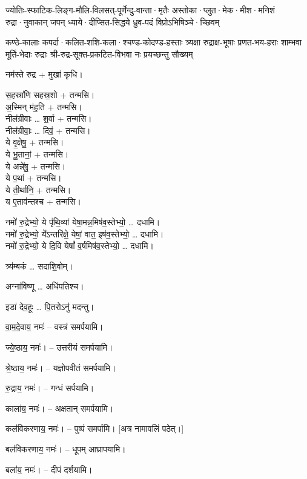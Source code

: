 \setlength{\shlokaspaceskip}{2pt}
{ज्योतिः-स्फाटिक-लिङ्ग-मौलि-विलसत्-पूर्णेन्दु-वान्ता·मृतैः}
{अस्तोका·प्लुत·मेक·मीश·मनिशं रुद्रा·नुवाकान् जपन्}
{ध्याये·दीप्सित-सिद्धये ध्रुव-पदं विप्रोऽभिषिञ्चे·च्छिवम्}

{कण्ठे-कालाः कपर्दा·कलित-शशि-कला·श्चण्ड-कोदण्ड-हस्ताः}
{त्र्यक्षा रुद्राक्ष-भूषाः प्रणत-भय-हराः शाम्भवा मूर्ति-भेदाः}
{रुद्राः श्री-रुद्र-सूक्त-प्रकटित-विभवा नः प्रयच्छन्तु सौख्यम्}

नम॑स्ते रुद्र + मुखा॑ कृधि।

स॒हस्रा॑णि सहस्र॒शो + तन्मसि।\\
अ॒स्मिन् म॑ह॒ति + तन्मसि।\\
नील॑ग्रीवाः … श॒र्वा + तन्मसि।\\
नील॑ग्रीवाः॒ … दिवं॒ + तन्मसि।\\
ये वृ॒क्षेषु॒ + तन्मसि।\\
ये भू॒तानां॒ + तन्मसि।\\
ये अन्ने॑षु॒ + तन्मसि।\\
ये प॒थां + तन्मसि।\\
ये ती॒र्थानि॒ + तन्मसि।\\
य ए॒ताव॑न्तश्च + तन्मसि।

नमो॑ रु॒द्रेभ्यो॒ ये पृ॑थि॒व्यां येषा॒मन्न॒मिष॑व॒स्तेभ्यो॒ … दधामि।\\
नमो॑ रु॒द्रेभ्यो॒ ये᳚ऽन्तरि॑क्षे॒ येषां॒ वात॒ इष॑व॒स्तेभ्यो॒ … दधामि।\\
नमो॑ रु॒द्रेभ्यो॒ ये दि॒वि येषां᳚ व॒र्षमिष॑व॒स्तेभ्यो॒ … दधामि।

त्र्य॑म्बकं … सदाशि॒वोम्।

अग्ना॑विष्णू … अधि॑पतिश्च।

इडा॑ देव॒हूः … पि॒तरोऽनु॑ मदन्तु।


वा॒म॒दे॒वाय॒ नमः॑ – वस्त्रं समर्पयामि।

ज्ये॒ष्ठाय॒ नमः॑। – उत्तरीयं समर्पयामि।

श्रे॒ष्ठाय॒ नमः॑। – यज्ञोपवीतं समर्पयामि।

रु॒द्राय॒ नमः॑। – गन्धं सर्पयामि।

काला॑य॒ नमः॑। – अक्षतान् समर्पयामि।

कल॑विकरणाय॒ नमः॑। – पुष्पं समर्पामि। [अत्र नामावलिं पठेत्।]

बल॑विकरणाय॒ नमः॑। – धूपम् आघ्रापयामि।

बला॑य॒ नमः॑। – दीपं दर्शयामि।

